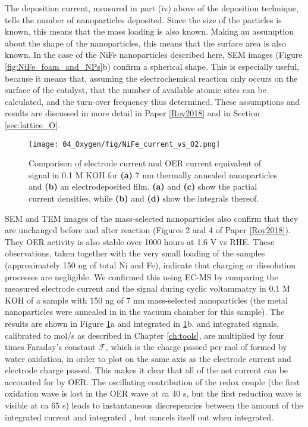 The deposition current, measured in part (iv) above of the deposition technique, tells the number of nanoparticles deposited. Since the size of the particles is known, this means that the mass loading is also known. Making an assumption about the shape of the nanoparticles, this means that the surface area is also known. In the case of the NiFe nanoparticles described here, SEM images (Figure \ref{fig:NiFe_foam_and_NPs}b) confirm a spherical shape. This is especially useful, because it means that, assuming the electrochemical reaction only occurs on the surface of the catalyst, that the number of available atomic sites can be calculated, and the turn-over frequency thus determined. These assumptions and results are discussed in more detail in Paper \ref{Roy2018} and in Section \ref{sec:lattice_O}.


\begin{figure}[h]
	\centering
	\texttt{[image: 04\_Oxygen/fig/NiFe\_current\_vs\_O2.png]}
	\caption{Comparison of electrode current and OER current equivalent of  signal in 0.1 M KOH for \textbf{(a)} 7 nm thermally annealed  nanoparticles and \textbf{(b)} an electrodeposited  film. \textbf{(a)} and \textbf{(c)} show the partial current densities, while \textbf{(b)} and \textbf{(d)} show the integrals thereof.}
	\label{fig:NiFe_current_vs_O2}
\end{figure}

SEM and TEM images of the mass-selected nanoparticles also confirm that they are unchanged before and after reaction (Figures 2 and 4 of Paper \ref{Roy2018}). They OER activity is also stable over 1000 hours at 1.6 V vs RHE. These observations, taken together with the very small loading of the samples (approximately 150 ng of total Ni and Fe), indicate that charging or dissolution processes are negligible. We confirmed this using EC-MS by comparing the measured electrode current and the  signal during cyclic voltammatry in 0.1 M KOH of a sample with 150 ng of 7 nm mass-selected  nanoparticles (the metal nanoparticles were annealed in  in the vacuum chamber for this sample). The results are shown in Figure \ref{fig:NiFe_current_vs_O2}a and integrated in \ref{fig:NiFe_current_vs_O2}b.  and integrated  signals, calibrated to mol/s as described in Chapter \ref{ch:tools}, are multiplied by four times Faraday's constant $\mathcal{F}$, which is the charge passed per mol of  formed by water oxidation, in order to plot on the same axis as the electrode current and electrode charge passed. This makes it clear that all of the net current can be accounted for by OER. The oscillating contribution of the  redox couple (the first oxidation wave is lost in the OER wave at ca 40 s, but the first reduction wave is visible at ca 65 s) leads to instantaneous discrepencies between the amount of the integrated current and integrated , but cancels itself out when integrated.

